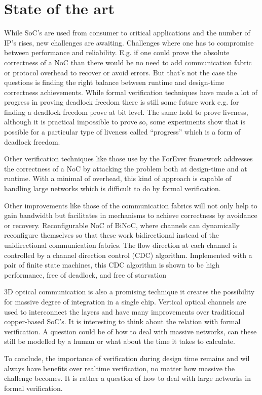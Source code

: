 \section{State of the art}

While SoC's are used from consumer to critical applications and the number of
IP's rises, new challenges are awaiting. Challenges where one has to compromise
between performance and reliability. E.g. if one could prove the absolute
correctness of a NoC than there would be no need to add communication fabric or
protocol overhead to recover or avoid errors. But that's not the case the
questions is finding the right balance between runtime and design-time
correctness achievements. While formal verification techniques have made a lot
of progress in proving deadlock freedom there is still some future work e.g. for
finding a deadlock freedom prove at bit level. The same hold to prove liveness,
although it is practical impossible to prove so, some experiments show that is
possible for a particular type of liveness called ``progress'' which is a form
of deadlock freedom. \cite{Ray:2012:SPV:2492708.2492936,itp}

Other verification techniques like those use by the ForEver framework addresses
the correctness of a NoC by attacking the problem both at design-time and at
runtime. With a minimal of overhead, this kind of approach is capable of
handling large networks which is difficult to do by formal verification.
\cite{Parikh:2014:FCF:2597868.2514871}

Other improvements like those of the communication fabrics will not only help to
gain bandwidth but facilitates in mechanisms to achieve correctness by avoidance
or recovery. Reconfigurable NoC of BiNoC, where channels can dynamically
reconfigure themselves so that these work bidirectional instead of the
unidirectional communication fabrics. The flow direction at each channel is
controlled by a channel direction control (CDC) algorithm. Implemented with a
pair of finite state machines, this CDC algorithm is shown to be high
performance, free of deadlock, and free of starvation \cite{5715603}

3D optical communication is also a promising technique it creates the
possibility for massive degree of integration in a single chip. Vertical optical
channels are used to interconnect the layers and have many improvements over
traditional copper-based SoC's. It is interesting to think about the relation
with formal verification. A question could be of how to deal with massive
networks, can these still be modelled by a human or what about the time it takes
to calculate.

To conclude, the importance of verification during design time remains and wil
always have benefits over realtime verification, no matter how massive the
challenge becomes. It is rather a question of how to deal with large networks in
formal verification. \cite{4542033,5306588}


\newpage

